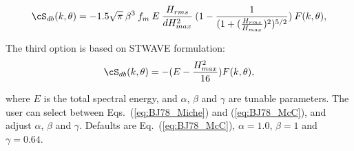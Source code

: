 \begin{equation}
\cS_{db} (k,\theta) = - 1.5 \sqrt{\pi} \: \beta^3 \: f_m  \: E \: \frac{H_{rms}}{dH_{max}^2}  \: (1- \frac{1}{(1+(\frac{H_{rms}}{H_{max}})^2)^{5/2}}) \: F(k,\theta)
 , \label{eq:BJ783b}
\end{equation}

The third option is based on STWAVE formulation:
\begin{equation}
\cS_{db} (k,\theta) =-({E} -\frac{H_{max}^2}{16})F(k,\theta)
 , \label{eq:BJ78v}
\end{equation}


\noindent
where $E$ is the total spectral energy, and $\alpha$, $\beta$ and $\gamma$ are tunable
parameters. The user can select between Eqs.~(\ref{eq:BJ78_Miche}) and
(\ref{eq:BJ78_McC}), and adjust $\alpha$, $\beta$ and $\gamma$. Defaults are
Eq.~(\ref{eq:BJ78_McC}), $\alpha = 1.0$, $\beta=1$ and $\gamma = 0.64$.
